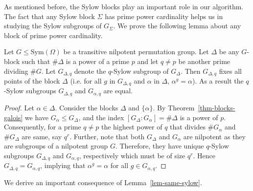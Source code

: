 \documentclass[prodmod,acmtalg]{acmsmall}
\newcommand{\Sym}[1]{{\ensuremath{\mathrm{Sym}\left(#1\right)}}}
\begin{document}
As mentioned before, the Sylow blocks play an important role in our
algorithm. The fact that any Sylow block $\Sigma$ has prime power
cardinality helps us in studying the Sylow subgroups of $G_\Sigma$. We
prove the following lemma about any block of prime power cardinality.

\begin{lemma}\label{lem-same-sylow}
  Let $G\leq\Sym{\Omega}$ be a transitive nilpotent permutation group.
  Let $\Delta$ be any $G$-block such that $\# \Delta$ is a power of a
  prime $p$ and let $q\neq p$ be another prime dividing $\# G$. Let
  $G_{\Delta,q}$ denote the $q$-Sylow subgroup of $G_\Delta$. Then
  $G_{\Delta,q}$ fixes all points of the block $\Delta$ (i.e. for all
  $g$ in $G_{\Delta,q}$ and $\alpha$ in $\Delta$, $\alpha^g =
  \alpha$). As a result the $q$-Sylow subgroups $G_{\Delta,q}$ and
  $G_{\alpha,q}$ are equal.
\end{lemma}
\begin{proof}
  Let $\alpha\in\Delta$. Consider the blocks $\Delta$ and $\{\alpha
  \}$. By Theorem~\ref{thm-blocks-galois} we have $G_\alpha \leq
  G_\Delta$, and the index $[G_\Delta: G_\alpha] = \# \Delta$ is a
  power of $p$. Consequently, for a prime $q\neq p$ the highest power
  of $q$ that divides $\# G_\alpha$ and $\# G_\Delta$ are same, say
  $q^r$. Further, note that both $G_\Delta$ and $G_\alpha$ are
  nilpotent as they are subgroups of a nilpotent group $G$. Therefore,
  they have unique $q$-Sylow subgroups $G_{\Delta,q}$ and
  $G_{\alpha,q}$, respectively which must be of size $q^r$. Hence
  $G_{\Delta,q}=G_{\alpha,q}$, implying that $\alpha^g=\alpha$ for all
  $g\in G_{\alpha,q}$.
\end{proof}

We derive an important consequence of Lemma~\ref{lem-same-sylow}.
\end{document}
